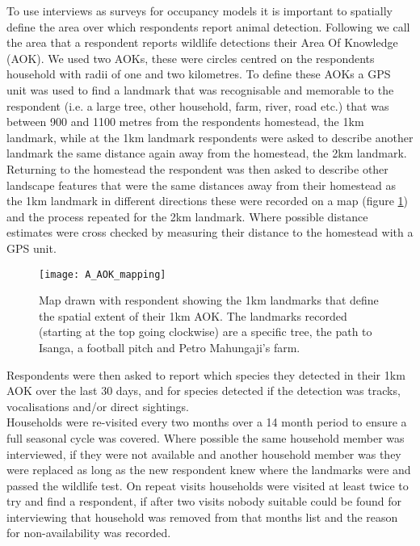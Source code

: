 To use interviews as surveys for occupancy models it is important to spatially define the area over which respondents report animal detection. Following \cite{Zeller_2011} we call the area that a respondent reports wildlife detections their Area Of Knowledge (AOK). We used two AOKs, these were circles centred on the respondents household with radii of one and two kilometres. To define these AOKs a GPS unit was used to find a landmark that was recognisable and memorable to the respondent (i.e. a large tree, other household, farm, river, road etc.) that was between 900 and 1100 metres from the respondents homestead, the 1km landmark, while at the 1km landmark respondents were asked to describe another landmark the same distance again away from the homestead, the 2km landmark. Returning to the homestead the respondent was then asked to describe other landscape features that were the same distances away from their homestead as the 1km landmark in different directions these were recorded on a map (figure \ref{fig:AOK_map}) and the process repeated for the 2km landmark. Where possible distance estimates were cross checked by measuring their distance to the homestead with a GPS unit.\\

\begin{figure}[htb]
\centering
\texttt{[image: A\_AOK\_mapping]}
\caption{Map drawn with respondent showing the 1km landmarks that define the spatial extent of their 1km AOK. The landmarks recorded (starting at the top going clockwise) are a specific tree, the path to Isanga, a football pitch and Petro Mahungaji's farm.}
\label{fig:AOK_map}
\end{figure}

Respondents were then asked to report which species they detected in their 1km AOK over the last 30 days, and for species detected if the detection was tracks, vocalisations and/or direct sightings.\\

Households were re-visited every two months over a 14 month period to ensure a full seasonal cycle was covered. Where possible the same household member was interviewed, if they were not available and another household member was they were replaced as long as the new respondent knew where the landmarks were and passed the wildlife test. On repeat visits households were visited at least twice to try and find a respondent, if after two visits nobody suitable could be found for interviewing that household was removed from that months list and the reason for non-availability was recorded.\\

